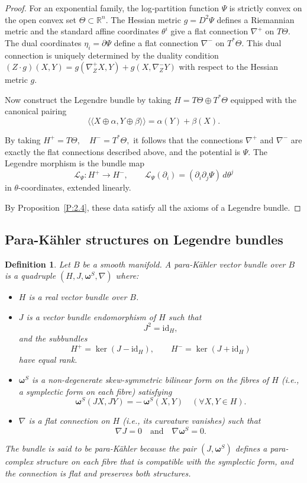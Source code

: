 \documentclass[12pt]{amsart}
\newtheorem{dfn}{Definition}
\begin{document}
\begin{proof}
For an exponential family, the log‑partition function $\Psi$ is strictly convex on the open convex set $\Theta\subset \mathbb{R}^n$. The Hessian metric $g = D^2 \Psi$ defines a Riemannian metric and the standard affine coordinates $\theta^i$ give a flat connection $\nabla^+$ on $T\Theta$.
The dual coordinates $\eta_i=\partial\Psi$ define a flat connection $\nabla^-$ on $T^*\Theta$. This dual connection is uniquely determined by the duality condition $
(Z \cdot g)(X,Y) = g(\nabla^+_Z X, Y) + g(X, \nabla^-_Z Y)$ with respect to the Hessian metric $g$.

 Now construct the Legendre bundle by taking $H = T\Theta \oplus T^*\Theta$
equipped with the canonical pairing
\[
\langle\!\langle X \oplus \alpha, Y \oplus \beta \rangle\!\rangle = \alpha(Y) + \beta(X).
\]

By taking $H^+ = T\Theta, \quad H^- = T^*\Theta,$ it follows that the connections $\nabla^+$ and $\nabla^-$ are exactly the flat connections described above, and the potential is $\Psi$. The Legendre morphism is the bundle map
\[
\mathscr{L}_\Psi : H^+ \to H^-, \qquad \mathscr{L}_\Psi(\partial_i) = (\partial_i \partial_j \Psi)\, d\theta^j
\]
in $\theta$-coordinates, extended linearly.  

By Proposition~\ref{P:2.4}, these data satisfy all the axioms of a Legendre bundle.\end{proof}

\subsection{Para-K\"ahler structures on Legendre bundles}

\begin{dfn}
    Let $B$ be a smooth manifold. A \emph{para-Kähler vector bundle} over $B$ is a quadruple $(H, J, \boldsymbol{\omega}^S, \nabla)$ where:

\begin{itemize}
    \item $H$ is a real vector bundle over $B$.
    \item $J$ is a vector bundle endomorphism of $H$ such that
    \[
    J^2 = \mathrm{id}_H,
    \]
    and the subbundles
    \[
    H^+ = \ker(J - \mathrm{id}_H), \qquad H^- = \ker(J + \mathrm{id}_H)
    \]
    have equal rank.
    \item $\boldsymbol{\omega}^S$ is a non-degenerate skew-symmetric bilinear form on the fibres of $H$ (i.e., a symplectic form on each fibre) satisfying
    \[
    \boldsymbol{\omega}^S(JX, JY) = -\,\boldsymbol{\omega}^S(X, Y) \quad (\forall X, Y \in H).
    \]
    \item $\nabla$ is a flat connection on $H$ (i.e., its curvature vanishes) such that
    \[
    \nabla J = 0 \quad \text{and} \quad \nabla \boldsymbol{\omega}^S = 0.
    \]
\end{itemize}

The bundle is said to be para-Kähler because the pair $(J, \boldsymbol{\omega}^S)$ defines a para-complex structure on each fibre that is compatible with the symplectic form, and the connection is flat and preserves both structures.
\end{dfn} 
\end{document}
